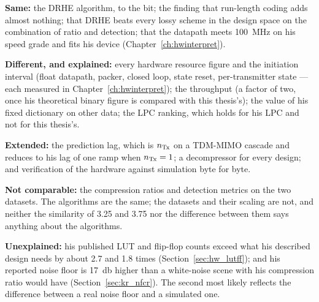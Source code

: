 \begin{keybox}
\textbf{Same:} the DRHE algorithm, to the bit; the finding that run-length
coding adds almost nothing; that DRHE beats every lossy scheme in the design
space on the combination of ratio and detection; that the datapath meets
\SI{100}{\mega\hertz} on his speed grade and fits his device
(Chapter~\ref{ch:hwinterpret}).

\textbf{Different, and explained:} every hardware resource figure and the
initiation interval (float datapath, packer, closed loop, state reset,
per-transmitter state --- each measured in Chapter~\ref{ch:hwinterpret}); the
throughput (a factor of two, once his theoretical binary figure is compared with
this thesis's); the value of his fixed dictionary on other data; the LPC
ranking, which holds for his LPC and not for this thesis's.

\textbf{Extended:} the prediction lag, which is $n_{\mathrm{Tx}}$ on a TDM-MIMO cascade
and reduces to his lag of one ramp when $n_{\mathrm{Tx}} = 1$; a decompressor for every
design; and verification of the hardware against simulation byte for byte.

\textbf{Not comparable:} the compression ratios and detection metrics on the
two datasets. The algorithms are the same; the datasets and their scaling are
not, and neither the similarity of 3.25 and 3.75 nor the difference between
them says anything about the algorithms.

\textbf{Unexplained:} his published LUT and flip-flop counts exceed what his
described design needs by about 2.7 and 1.8 times (Section~\ref{sec:hw_lutff});
and his reported noise floor is \SI{17}{\decibel} higher than a white-noise
scene with his compression ratio would have (Section~\ref{sec:kr_nfcr}). The
second most likely reflects the difference between a real noise floor and a
simulated one.
\end{keybox}
